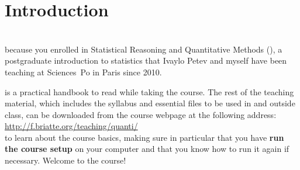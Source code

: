 %
%
\chapter{Introduction}%
	\label{ch:introduction}
  \begin{mybox}%
  \footnotesize{%
  \\[1em]%
	 because you enrolled in Statistical Reasoning and Quantitative Methods (\SRQM), a postgraduate introduction to statistics that Ivaylo Petev and myself have been teaching at Sciences~Po in Paris since 2010.%
  
   is a practical handbook to read while taking the course. The rest of the teaching material, which includes the syllabus and essential files to be used in and outside class, can be downloaded from the course webpage at the following address:\\[1em]%

    \url{http://f.briatte.org/teaching/quanti/}\\[1em]%
		
   to learn about the course basics, making sure in particular that you have \textbf{run the course setup} on your computer and that you know how to run it again if necessary. Welcome to the course!%

  }%
  \end{mybox}
  \startcontents[chapters]%
	\newpage

%
%
%
%
%
%
%
%
%
%
%

%
%
%

\stopcontents[chapters]
